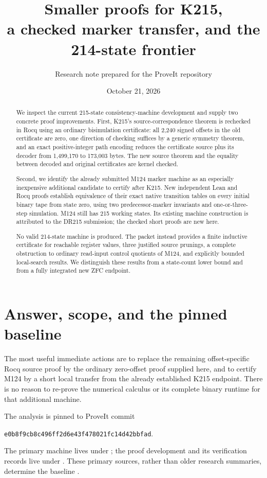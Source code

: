 \documentclass[11pt]{article}
\title{Smaller proofs for K215,\texorpdfstring{\\}{ }a checked marker transfer, and the 214-state frontier}
\author{Research note prepared for the ProveIt repository}
\date{October 21, 2026}
\theoremstyle{remark}\newtheorem{remark}[theorem]{Remark}
\newcommand{\code}[1]{\texttt{\small #1}}
\begin{document}
\maketitle
\begin{abstract}
We inspect the current 215-state consistency-machine development and supply two concrete proof improvements. First, K215's source-correspondence theorem is rechecked in Rocq using an ordinary bisimulation certificate: all 2,240 signed offsets in the old certificate are zero, one direction of checking suffices by a generic symmetry theorem, and an exact positive-integer path encoding reduces the certificate source plus its decoder from 1,499,170 to 173,003 bytes. The new source theorem and the equality between decoded and original certificates are kernel checked.

Second, we identify the already submitted M124 marker machine as an especially inexpensive additional candidate to certify after K215. New independent Lean and Rocq proofs establish equivalence of their exact native transition tables on every initial binary tape from state zero, using two predecessor-marker invariants and one-or-three-step simulation. M124 still has 215 working states. Its existing machine construction is attributed to the DR215 submission; the checked short proofs are new here.

No valid 214-state machine is produced. The packet instead provides a finite inductive certificate for reachable register values, three justified source prunings, a complete obstruction to ordinary read-input control quotients of M124, and explicitly bounded local-search results. We distinguish these results from a state-count lower bound and from a fully integrated new ZFC endpoint.
\end{abstract}
\setcounter{tocdepth}{1}
\tableofcontents
\newpage

\section{Answer, scope, and the pinned baseline}

The most useful immediate actions are to replace the remaining offset-specific Rocq source proof by the ordinary zero-offset proof supplied here, and to certify M124 by a short local transfer from the already established K215 endpoint. There is no reason to re-prove the numerical calculus or its complete binary runtime for that additional machine.

The analysis is pinned to ProveIt commit
\begin{center}\code{e0b8f9cb8c496ff2d6e43f478021fc14d42bbfad}.\end{center}
The primary machine lives under
; the proof development and its verification records live under
.
These primary sources, rather than older research summaries, determine the baseline \cite{primary,formal,simplification}.
\end{document}
